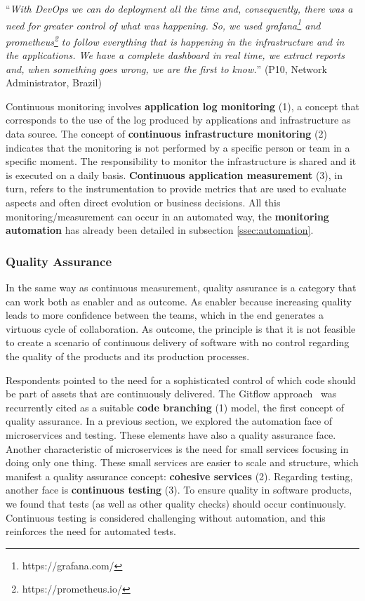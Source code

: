 \begin{mq}
``\emph{With DevOps we can do deployment all the time and, consequently, there was
a need for greater control of what was happening. So, we used
grafana\footnote{https://grafana.com/} and
prometheus\footnote{https://prometheus.io/} to follow everything that is
happening in the infrastructure and in the applications. We have a complete
dashboard in real time, we extract reports and, when something goes wrong, we
are the first to know.}'' (P10, Network Administrator, Brazil)
\end{mq}

Continuous monitoring involves \textbf{application log monitoring} (1), a
concept that corresponds to the use of the log produced by
applications and infrastructure as data source. The concept of
\textbf{continuous infrastructure monitoring} (2) indicates that the monitoring
is not performed by a specific person or team in a specific moment. The
responsibility to monitor the infrastructure is shared and it is executed on
a daily basis. \textbf{Continuous application measurement} (3), in turn, refers to
the instrumentation to provide metrics that are used to evaluate aspects and
often direct evolution or business decisions. All this monitoring/measurement
can occur in an automated way, the \textbf{monitoring automation} has already been
detailed in subsection \ref{ssec:automation}.

\subsubsection{Quality Assurance}

In the same way as continuous measurement, quality assurance is a category that
can work both as enabler and as outcome. As enabler because increasing quality
leads to more confidence between the teams, which in the end generates a virtuous
cycle of collaboration. As outcome, the principle is that it is not
feasible to create a scenario of continuous delivery of software with no control
regarding the quality of the products and its production processes.

Respondents pointed to the need for a sophisticated control of which code should
be part of assets that are continuously delivered. The Gitflow
approach~\cite[Chapter~5]{wheeler:2016} was recurrently cited as a
suitable \textbf{code branching} (1) model, the first
concept of quality assurance.
In a previous section, we explored the automation face of
microservices and testing. These elements have also a quality assurance face.
Another characteristic of microservices is the need for small services focusing
in doing only one thing. These small services are easier to scale and
structure, which manifest a quality assurance concept: \textbf{cohesive
services} (2). Regarding testing, another face is \textbf{continuous
testing} (3). To ensure quality in software products, we found that
tests (as well as other quality checks) should occur continuously. Continuous testing
is considered challenging without automation, and this reinforces the need for automated
tests.


